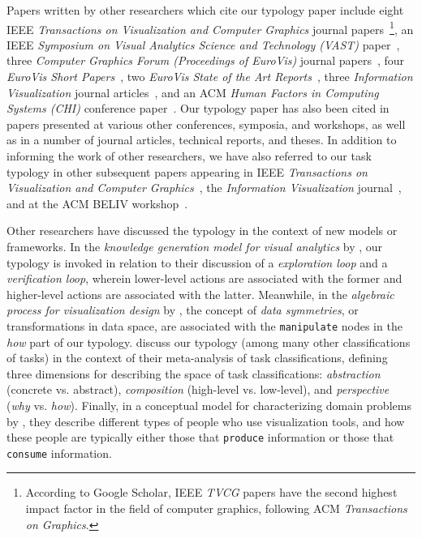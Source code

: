 Papers written by other researchers which cite our typology paper include eight IEEE {\it Transactions on Visualization and Computer Graphics} journal papers~\cite{Blascheck2015,Kerracher2015,Kindlmann2014,Sacha2014,Saket2014,Scheepens2015,Sedlmair2014,Zhou2015}\footnote{According to Google Scholar, IEEE {\it TVCG} papers have the second highest impact factor in the field of computer graphics, following ACM {\it Transactions on Graphics}.}, an IEEE {\it Symposium on Visual Analytics Science and Technology (VAST)} paper~\cite{Gomez2014}, three {\it Computer Graphics Forum (Proceedings of EuroVis)} journal papers~\cite{Conati2014,Saket2015,Walny2015}, four {\it EuroVis Short Papers}~\cite{Mittelstadt2015,Nusrat2015,Saket2014a,Saket2015a}, two {\it EuroVis State of the Art Reports}~\cite{Blascheck2014,Wagner2015}, three {\it Information Visualization} journal articles~\cite{Rind2015,Simon2015,Winters2015}, and an ACM {\it Human Factors in Computing Systems (CHI)} conference paper~\cite{Taher2015}.
Our typology paper has also been cited in papers presented at various other conferences, symposia, and workshops, as well as in a number of journal articles, technical reports, and theses.
In addition to informing the work of other researchers, we have also referred to our task typology in other subsequent papers appearing in IEEE {\it Transactions on Visualization and Computer Graphics}~\cite{Fulda2015}, the {\it Information Visualization} journal~\cite{Dawson2015,Meyer2015}, and at the ACM BELIV workshop~\cite{Brehmer2014a}. 

Other researchers have discussed the typology in the context of new models or frameworks.
In the {\it knowledge generation model for visual analytics} by \citet{Sacha2014}, our typology is invoked in relation to their discussion of a {\it exploration loop} and a {\it verification loop}, wherein lower-level actions are associated with the former and higher-level actions are associated with the latter. 
Meanwhile, in the {\it algebraic process for visualization design} by \citet{Kindlmann2014}, the concept of {\it data symmetries}, or transformations in data space, are associated with the {\tt manipulate} nodes in the {\it how} part of our typology.
\citet{Rind2015} discuss our typology (among many other classifications of tasks) in the context of their meta-analysis of task classifications, defining three dimensions for describing the space of task classifications: {\it abstraction} (concrete vs. abstract), {\it composition} (high-level vs. low-level), and {\it perspective} ({\it why} vs. {\it how}).
Finally, in a conceptual model for characterizing domain problems by \citet{Winters2015}, they describe different types of people who use visualization tools, and how these people are typically either those that {\tt produce} information or those that {\tt consume} information.


